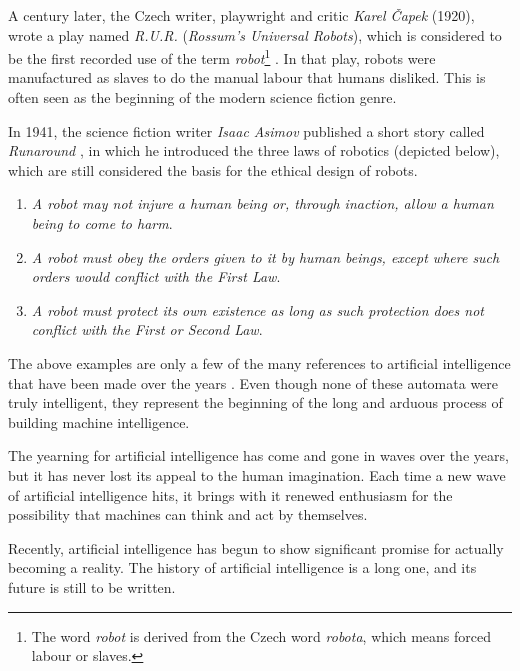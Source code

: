 A century later, the Czech writer, playwright and critic \textit{Karel Čapek} (1920), wrote a play named \textit{R.U.R.} (\textit{Rossum’s Universal Robots}), which is considered to be the first recorded use of the term \textit{robot}\footnote{The word \textit{robot} is derived from the Czech word \textit{robota}, which means forced labour or slaves.}  \autocite{nils2009}. In that play, robots were manufactured as slaves to do the manual labour that humans disliked. This is often seen as the beginning of the modern science fiction genre.

In 1941, the science fiction writer \textit{Isaac Asimov} published a short story called \textit{Runaround} \autocite{nils2009}, in which he introduced the three laws of robotics (depicted below), which are still considered the basis for the ethical design of robots.

\begin{enumerate}
	\item \textit{A robot may not injure a human being or, through inaction, allow a human being to come to harm}.
	\item \textit{A robot must obey the orders given to it by human beings, except where such orders would conflict with the First Law}.
	\item \textit{A robot must protect its own existence as long as such protection does not conflict with the First or Second Law}.
\end{enumerate}

The above examples are only a few of the many references to artificial intelligence that have been made over the years \autocite{nils2009}. Even though none of these automata were truly intelligent, they represent the beginning of the long and arduous process of building machine intelligence.  

The yearning for artificial intelligence has come and gone in waves over the years, but it has never lost its appeal to the human imagination. Each time a new wave of artificial intelligence hits, it brings with it renewed enthusiasm for the possibility that machines can think and act by themselves. 

Recently, artificial intelligence has begun to show significant promise for actually becoming a reality. The history of artificial intelligence is a long one, and its future is still to be written.

